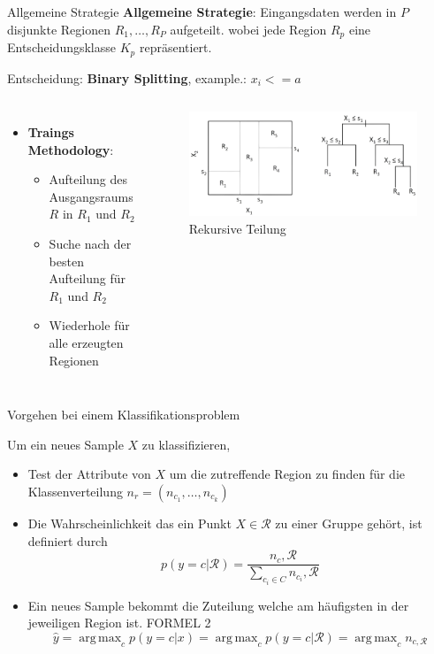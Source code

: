 \documentclass{beamer}
\DeclareMathOperator*{\argmax}{arg\,max}
\begin{document}
\begin{frame}{Allgemeine Strategie}
	\textbf{Allgemeine Strategie}: Eingangsdaten werden in $P$ disjunkte Regionen $R_1,\dots,R_P$ aufgeteilt. 
	wobei jede Region $R_p$ eine Entscheidungsklasse $K_p$ repräsentiert. 
 	
	Entscheidung: \textbf{Binary Splitting}, example.: $x_i <= a$
	
	\begin{columns}
 			\begin{itemize}
				\item{\textbf{Traings Methodology}:}
				\begin{itemize}
					\item {Aufteilung des Ausgangsraums $R$ in $R_1$ und $R_2$}
					\item{Suche nach der besten Aufteilung für $R_1$ und $R_2$}
					\item{Wiederhole für alle erzeugten Regionen}
				\end{itemize}
			\end{itemize}
			
			\begin{figure}
				\includegraphics[width=\linewidth]{Images/split.png}
				\caption{Rekursive Teilung \cite{hastie_tibshirani_friedman}}
			\end{figure}
	\end{columns}
\end{frame}



\begin{frame}{Vorgehen bei einem Klassifikationsproblem}

Um ein neues Sample $X$ zu klassifizieren,
	\begin{itemize}
		\item Test der Attribute von $X$ um die zutreffende Region zu finden für die Klassenverteilung $n_r = (n_{c_1}, \ldots, n_{c_k})$
		\item Die Wahrscheinlichkeit das ein Punkt $X \in \mathcal{R}$ zu einer Gruppe gehört, ist definiert durch
			\[p(y = c | \mathcal{R}) = \frac{n_c, \mathcal{R}}{\sum_{c_i \in C} n_{c_i}, \mathcal{R}}\]
		\item Ein neues Sample bekommt die Zuteilung welche am häufigsten in der jeweiligen Region ist. FORMEL 2
			\[\hat{y} = \argmax_c p(y = c | x) = \argmax_c p(y = c | \mathcal{R}) = \argmax_c n_{c,\mathcal{R}}\]
	\end{itemize}
\end{frame}
\end{document}

